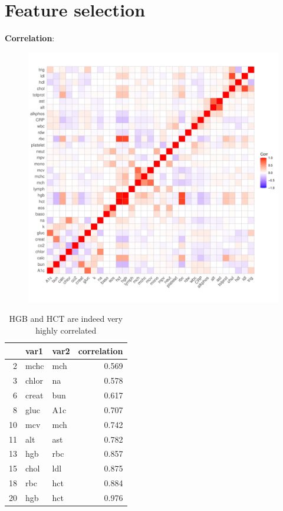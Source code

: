 \documentclass[12pt]{article}
\begin{document}
\section*{Feature selection}


\textbf{Correlation}:

\begin{figure}[h]
\centering
\includegraphics[width=\textwidth]{figures/lab_corr.pdf}
\end{figure}

\begin{table}[h]
\centering
\begin{tabular}{rllr}
  \hline
 & var1 & var2 & correlation \\ 
  \hline
  2 & mchc & mch & 0.569 \\ 
  3 & chlor & na & 0.578 \\ 
  6 & creat & bun & 0.617 \\ 
  8 & gluc & A1c & 0.707 \\ 
  10 & mcv & mch & 0.742 \\ 
  11 & alt & ast & 0.782 \\ 
  13 & hgb & rbc & 0.857 \\ 
  15 & chol & ldl & 0.875 \\ 
  18 & rbc & hct & 0.884 \\ 
  20 & hgb & hct & 0.976 \\ 
   \hline
\end{tabular}
\caption{HGB and HCT are indeed very highly correlated}
\end{table}
\end{document}
